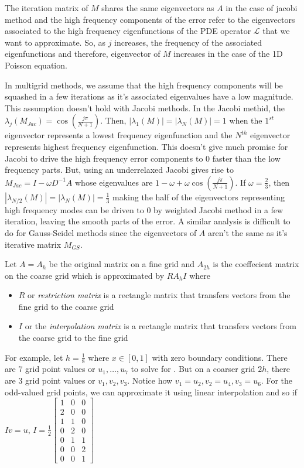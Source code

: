 \documentclass[12pt]{article}
\begin{document}
The iteration matrix of $M$ shares the same eigenvectors as $A$ in the case of jacobi method and the high frequency components of the error refer to the eigenvectors associated to the high frequency eigenfunctions of the PDE operator $\mathcal{L}$ that we want to approximate. So, as $j$ increases, the frequency of the associated eigenfunctions and therefore, eigenvector of $M$ increases in the case of the 1D Poisson equation. 

In multigrid methods, we assume that the high frequency components  will be squashed in a few iterations as it's associated eigenvalues have a low magnitude. This assumption doesn't hold with Jacobi methods. In the Jacobi methid, the $\lambda_j(M_{Jac}) = \cos(\frac{j\pi}{N + 1})$. Then, $|\lambda_1(M)| = |\lambda_N(M)| = 1$ when the $1^{st}$ eigenvector represents a lowest frequency eigenfunction and the $N^{th}$ eigenvector represents highest frequency eigenfunction. This doesn't give much promise for Jacobi to drive the high frequency error components to $0$ faster than the low frequency parts. But, using an underrelaxed Jacobi gives rise to $M_{Jac} = I - \omega D^{-1}A$ whose eigenvalues are $1 - \omega + \omega\cos(\frac{j\pi}{N + 1})$. If $\omega = \frac{2}{3}$, then $|\lambda_{N/2}(M)| = |\lambda_N(M)| = \frac{1}{3}$ making the half of the eigenvectors representing high frequency modes can be driven to $0$ by weighted Jacobi method in a few iteration, leaving the smooth parts of the error. A similar analysis is difficult to do for Gauss-Seidel methods since the eigenvectors of $A$ aren't the same as it's iterative matrix $M_{GS}$. 

Let $A = A_h$ be the original matrix on a fine grid and $A_{2h}$ is the coeffecient matrix on the coarse grid which is approximated by $RA_hI$ where 

\begin{itemize}
    \item $R$ or \textit{restriction matrix} is a rectangle matrix that transfers vectors from the fine grid to the coarse grid
    \item $I$ or the \textit{interpolation matrix} is a rectangle matrix that transfers vectors from the coarse grid to the fine grid
\end{itemize}

For example, let $h = \frac{1}{8}$ where $x \in [0, 1]$ with zero boundary conditions. There are $7$ grid point values or $u_1, \dots, u_7$ to solve for . But on a coarser grid $2h$, there are $3$ grid point values or $v_1, v_2, v_3$. Notice how $v_1 = u_2, v_2 = u_4, v_3 = u_6$. For the odd-valued grid points, we can approximate it using linear interpolation and so if $Iv = u$, $I = \frac{1}{2} \begin{bmatrix}
    1 & 0 & 0 \\
    2 & 0 & 0 \\
    1 & 1 & 0 \\
    0 & 2 & 0 \\
    0 & 1 & 1\\
    0 & 0 & 2 \\
    0 & 0 & 1
\end{bmatrix}$
\end{document}
